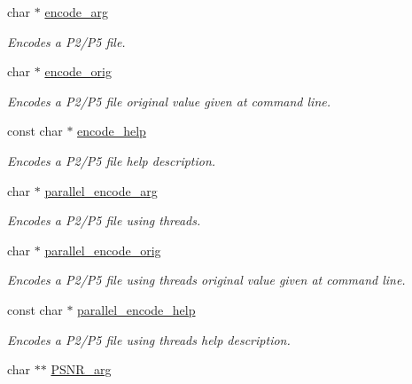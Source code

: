 \begin{DoxyCompactItemize}
char $\ast$ \hyperlink{structgengetopt__args__info_a239d3bebc999ba0c82a711b355e8a8f9}{encode\+\_\+arg}
\begin{DoxyCompactList}\small\item\em Encodes a P2/\+P5 file. \end{DoxyCompactList}\item 
char $\ast$ \hyperlink{structgengetopt__args__info_acb893689b182218054b2bd202c13042f}{encode\+\_\+orig}
\begin{DoxyCompactList}\small\item\em Encodes a P2/\+P5 file original value given at command line. \end{DoxyCompactList}\item 
const char $\ast$ \hyperlink{structgengetopt__args__info_a9a9249c35f6b920c9adcf5b604e0e098}{encode\+\_\+help}
\begin{DoxyCompactList}\small\item\em Encodes a P2/\+P5 file help description. \end{DoxyCompactList}\item 
char $\ast$ \hyperlink{structgengetopt__args__info_ad1f8b6acc1b4b6a6390fcc35eaf3694d}{parallel\+\_\+encode\+\_\+arg}
\begin{DoxyCompactList}\small\item\em Encodes a P2/\+P5 file using threads. \end{DoxyCompactList}\item 
char $\ast$ \hyperlink{structgengetopt__args__info_aed4928a51c33857c16e2ea0a4fa2ca2a}{parallel\+\_\+encode\+\_\+orig}
\begin{DoxyCompactList}\small\item\em Encodes a P2/\+P5 file using threads original value given at command line. \end{DoxyCompactList}\item 
const char $\ast$ \hyperlink{structgengetopt__args__info_a8518c070a081f81d1092578f53459751}{parallel\+\_\+encode\+\_\+help}
\begin{DoxyCompactList}\small\item\em Encodes a P2/\+P5 file using threads help description. \end{DoxyCompactList}\item 
\hypertarget{structgengetopt__args__info_a6910ffcb8c91738db472b90e68b27593}{}char $\ast$$\ast$ \hyperlink{structgengetopt__args__info_a6910ffcb8c91738db472b90e68b27593}{P\+S\+N\+R\+\_\+arg}\label{structgengetopt__args__info_a6910ffcb8c91738db472b90e68b27593}


\end{DoxyCompactItemize}
